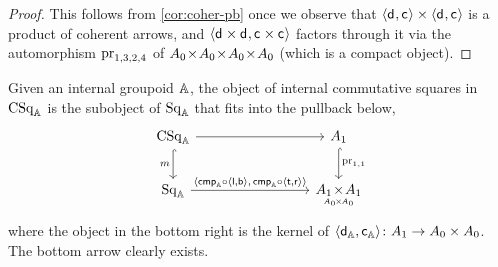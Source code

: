 \documentclass[a4paper,11pt]{amsart}
\newcommand{\kpdcincat}[1]{\argpdf{#1}\hspace{-2ex}\underset{\mbox{\tiny$\obgpdf{#1}\!\!\times\!\!\obgpdf{#1}$}}{\times}\hspace{-2ex}\argpdf{#1}}
\newcommand{\Akpdcin}{\kpdcincat{A}}
\newcommand{\sqincat}[1]{\mathrm{Sq}_{#1}}
\newcommand{\Asqin}{\sqincat{\Agpdf}}
\newcommand{\csqincat}[1]{\mathrm{CSq}_{#1}}
\newcommand{\Acsqin}{\csqincat{\Agpdf}}
\begin{document}
\begin{proof}
	This follows from \cref{cor:coher-pb} once we observe that
	$\langle{\mathsf{d}_{},\mathsf{c}_{}}\rangle\times\langle{\mathsf{d}_{},\mathsf{c}_{}}\rangle$ is a product of coherent arrows,
	and $\langle{\mathsf{d}_{}\times \mathsf{d}_{},\mathsf{c}_{}\times \mathsf{c}_{}}\rangle$ factors through it via the automorphism
	${\mathrm{pr}}_{1,3,2,4}$ of $A_0\!\times\! A_0\!\times\! A_0\!\times\! A_0$ (which is a compact object).
\end{proof}
%

Given an internal groupoid $\mathbb{A}$,
the object of internal commutative squares in $\Acsqin$
is the subobject of $\Asqin$ that fits into the pullback below,
\begin{equation}\label{eq:comm-squares}
\begin{tikzcd}[column sep=19ex, row sep=5ex]
	\Acsqin	\ar[d,"m"',hook] \ar[r]	&	\Aargpdf	\ar[d,"\pr{1,1}",hook]
	\\
	\Asqin	\ar[r,"\ple{\Acmpgpdf \arcmp\ple{\mathsf{l},\mathsf{b}},\, \Acmpgpdf \arcmp\ple{\mathsf{t},\mathsf{r}}}"]
	&	\Akpdcin
\end{tikzcd}
\end{equation}
where the object in the bottom right is the kernel of $\langle{\mathsf{d}_{\mathbb{A}},\mathsf{c}_{\mathbb{A}}}\rangle\colon {A}_1 \to {A}_0 \times {A}_0$.
The bottom arrow clearly exists.
\end{document}
